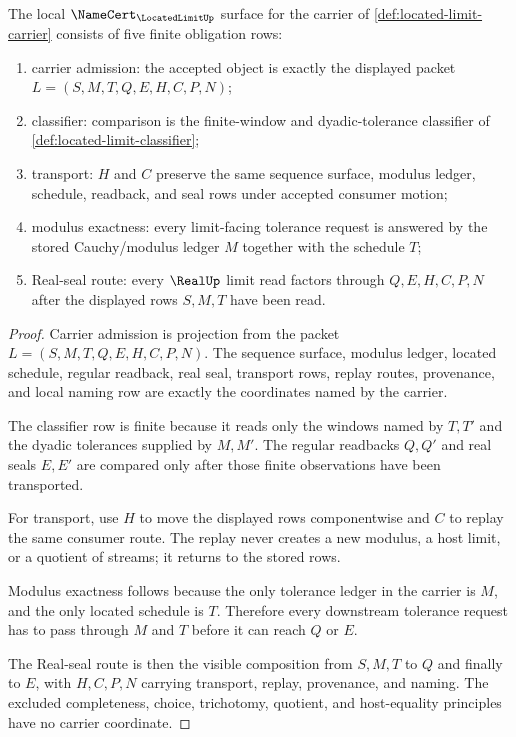 \begin{theorem}
\label{thm:located-limit-namecert-obligations}
The local $\NameCert_{\LocatedLimitUp}$ surface for the carrier of \autoref{def:located-limit-carrier} consists of five finite obligation rows:
\begin{enumerate}
\item carrier admission: the accepted object is exactly the displayed packet $L=(S,M,T,Q,E,H,C,P,N)$;
\item classifier: comparison is the finite-window and dyadic-tolerance classifier of \autoref{def:located-limit-classifier};
\item transport: $H$ and $C$ preserve the same sequence surface, modulus ledger, schedule, readback, and seal rows under accepted consumer motion;
\item modulus exactness: every limit-facing tolerance request is answered by the stored Cauchy/modulus ledger $M$ together with the schedule $T$;
\item Real-seal route: every $\RealUp$ limit read factors through $Q,E,H,C,P,N$ after the displayed rows $S,M,T$ have been read.
\end{enumerate}
\end{theorem}
\begin{proof}
Carrier admission is projection from the packet $L=(S,M,T,Q,E,H,C,P,N)$. The sequence surface, modulus ledger, located schedule, regular readback, real seal, transport rows, replay routes, provenance, and local naming row are exactly the coordinates named by the carrier.

The classifier row is finite because it reads only the windows named by $T,T'$ and the dyadic tolerances supplied by $M,M'$. The regular readbacks $Q,Q'$ and real seals $E,E'$ are compared only after those finite observations have been transported.

For transport, use $H$ to move the displayed rows componentwise and $C$ to replay the same consumer route. The replay never creates a new modulus, a host limit, or a quotient of streams; it returns to the stored rows.

Modulus exactness follows because the only tolerance ledger in the carrier is $M$, and the only located schedule is $T$. Therefore every downstream tolerance request has to pass through $M$ and $T$ before it can reach $Q$ or $E$.

The Real-seal route is then the visible composition from $S,M,T$ to $Q$ and finally to $E$, with $H,C,P,N$ carrying transport, replay, provenance, and naming. The excluded completeness, choice, trichotomy, quotient, and host-equality principles have no carrier coordinate.
\end{proof}

